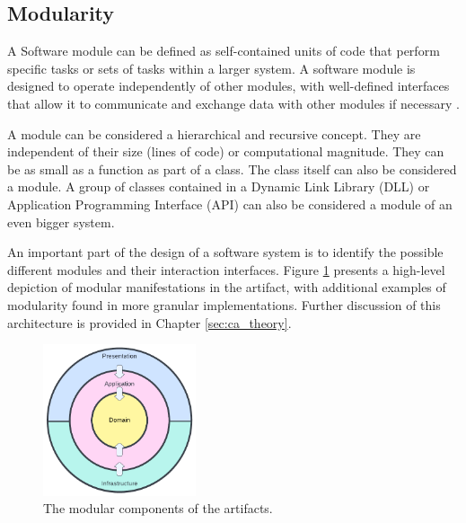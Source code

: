 \subsection{Modularity}

A Software module can be defined as self-contained units of code that perform specific
tasks or sets of tasks within a larger system. A software module is designed to operate
independently of other modules, with well-defined interfaces that allow it to communicate
and exchange data with other modules if necessary \autocite[22]{mannaert_normalized_2016}.

A module can be considered a hierarchical and recursive concept. They are independent of
their size (lines of code) or computational magnitude. They can be as small as a function
as part of a class. The class itself can also be considered a module. A group of classes
contained in a Dynamic Link Library (DLL) or Application Programming Interface (API) can
also be considered a module of an even bigger system. 

An important part of the design of a software system is to identify the possible different
modules and their interaction interfaces. Figure \ref{fig:modulair_components} presents a
high-level depiction of modular manifestations in the artifact, with additional examples
of modularity found in more granular implementations. Further discussion of this
architecture is provided in Chapter \ref{sec:ca_theory}.

\begin{figure}[H]
    \centering
    \includegraphics[width=0.4\textwidth]{Figures/ca_diagram.pdf}
    \caption[modularity]{The modular components of the artifacts.}
    \label{fig:modulair_components}
\end{figure}